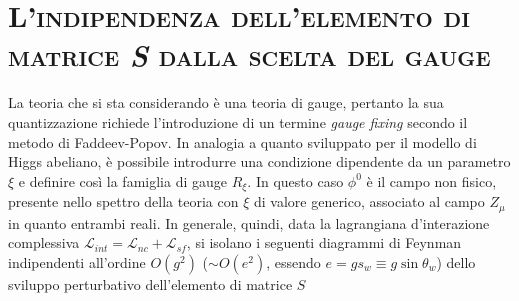 \documentclass[11pt]{article}
\begin{document}
    \section{\centering\textsc{L'indipendenza dell'elemento di matrice \textit{S} dalla scelta del gauge} } %
    La teoria che si sta considerando è una teoria di gauge, pertanto la sua quantizzazione richiede l'introduzione di un termine \textit{gauge fixing} secondo il metodo di Faddeev-Popov. In analogia a quanto sviluppato per il modello di Higgs abeliano,
    è possibile introdurre una condizione dipendente da un parametro $\xi$ e definire così la famiglia di gauge $R_\xi$. In questo caso $\phi^0$ è il campo non fisico, presente nello spettro della teoria con $\xi$ di valore generico, associato al campo $Z_\mu$ in quanto entrambi reali.
    In generale, quindi, data la lagrangiana d'interazione complessiva $\mathcal{L}_{int}=\mathcal{L}_{nc}+\mathcal{L}_{sf}$, si isolano i seguenti diagrammi di Feynman indipendenti all'ordine $O(g^2)$ ($\sim O(e^2)$, essendo $e=gs_w\equiv g\sin\theta_w$) dello sviluppo perturbativo
    dell'elemento di matrice $S$
\end{document}
